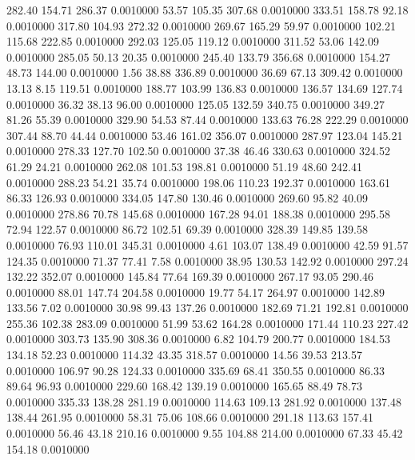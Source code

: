  282.40  154.71  286.37   0.0010000
  53.57  105.35  307.68   0.0010000
 333.51  158.78   92.18   0.0010000
 317.80  104.93  272.32   0.0010000
 269.67  165.29   59.97   0.0010000
 102.21  115.68  222.85   0.0010000
 292.03  125.05  119.12   0.0010000
 311.52   53.06  142.09   0.0010000
 285.05   50.13   20.35   0.0010000
 245.40  133.79  356.68   0.0010000
 154.27   48.73  144.00   0.0010000
   1.56   38.88  336.89   0.0010000
  36.69   67.13  309.42   0.0010000
  13.13    8.15  119.51   0.0010000
 188.77  103.99  136.83   0.0010000
 136.57  134.69  127.74   0.0010000
  36.32   38.13   96.00   0.0010000
 125.05  132.59  340.75   0.0010000
 349.27   81.26   55.39   0.0010000
 329.90   54.53   87.44   0.0010000
 133.63   76.28  222.29   0.0010000
 307.44   88.70   44.44   0.0010000
  53.46  161.02  356.07   0.0010000
 287.97  123.04  145.21   0.0010000
 278.33  127.70  102.50   0.0010000
  37.38   46.46  330.63   0.0010000
 324.52   61.29   24.21   0.0010000
 262.08  101.53  198.81   0.0010000
  51.19   48.60  242.41   0.0010000
 288.23   54.21   35.74   0.0010000
 198.06  110.23  192.37   0.0010000
 163.61   86.33  126.93   0.0010000
 334.05  147.80  130.46   0.0010000
 269.60   95.82   40.09   0.0010000
 278.86   70.78  145.68   0.0010000
 167.28   94.01  188.38   0.0010000
 295.58   72.94  122.57   0.0010000
  86.72  102.51   69.39   0.0010000
 328.39  149.85  139.58   0.0010000
  76.93  110.01  345.31   0.0010000
   4.61  103.07  138.49   0.0010000
  42.59   91.57  124.35   0.0010000
  71.37   77.41    7.58   0.0010000
  38.95  130.53  142.92   0.0010000
 297.24  132.22  352.07   0.0010000
 145.84   77.64  169.39   0.0010000
 267.17   93.05  290.46   0.0010000
  88.01  147.74  204.58   0.0010000
  19.77   54.17  264.97   0.0010000
 142.89  133.56    7.02   0.0010000
  30.98   99.43  137.26   0.0010000
 182.69   71.21  192.81   0.0010000
 255.36  102.38  283.09   0.0010000
  51.99   53.62  164.28   0.0010000
 171.44  110.23  227.42   0.0010000
 303.73  135.90  308.36   0.0010000
   6.82  104.79  200.77   0.0010000
 184.53  134.18   52.23   0.0010000
 114.32   43.35  318.57   0.0010000
  14.56   39.53  213.57   0.0010000
 106.97   90.28  124.33   0.0010000
 335.69   68.41  350.55   0.0010000
  86.33   89.64   96.93   0.0010000
 229.60  168.42  139.19   0.0010000
 165.65   88.49   78.73   0.0010000
 335.33  138.28  281.19   0.0010000
 114.63  109.13  281.92   0.0010000
 137.48  138.44  261.95   0.0010000
  58.31   75.06  108.66   0.0010000
 291.18  113.63  157.41   0.0010000
  56.46   43.18  210.16   0.0010000
   9.55  104.88  214.00   0.0010000
  67.33   45.42  154.18   0.0010000

